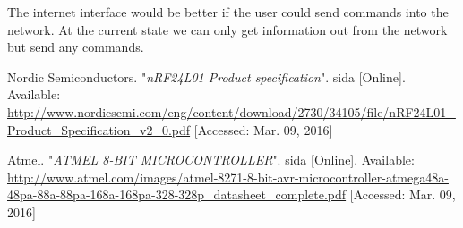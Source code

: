 \documentclass[a4paper,11pt]{article}
\begin{document}
The internet interface would be better if the user could send commands
into the network. At the current state we can only get information out
from the network but send any commands.

\begin{thebibliography}{2}

  Nordic Semiconductors. "\emph{nRF24L01 Product specification}". sida [Online]. Available: \url{http://www.nordicsemi.com/eng/content/download/2730/34105/file/nRF24L01_Product_Specification_v2_0.pdf} [Accessed: Mar. 09, 2016]

  Atmel. "\emph{ATMEL 8-BIT MICROCONTROLLER}". sida [Online]. Available: \url{http://www.atmel.com/images/atmel-8271-8-bit-avr-microcontroller-atmega48a-48pa-88a-88pa-168a-168pa-328-328p_datasheet_complete.pdf} [Accessed: Mar. 09, 2016]

\end{thebibliography}
\end{document}
